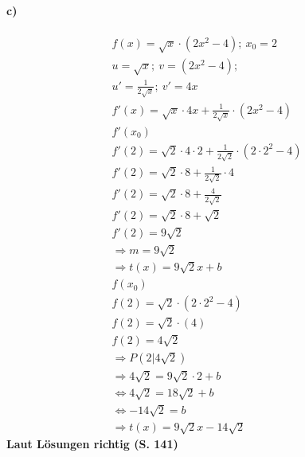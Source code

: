 \documentclass[12pt,a4paper]{report}
\newcommand{\richtig}[1]{\color{ForestGreen}\textbf{
	Laut Lösungen richtig (S. #1)
}\color{black}}
\begin{document}
	\paragraph{c)}
	\begin{align*}
		f(x) = \sqrt{x} \cdot (2x^2 - 4);\ x_0 = 2 \\
		u = \sqrt{x};\ v = (2x^2 - 4);\\
		u'=\frac{1}{2\sqrt{x}};\ v' = 4x \\
		f'(x) = \sqrt{x} \cdot 4x + \frac{1}{2\sqrt{x}} \cdot (2x^2 - 4) \\
		f'(x_0)\\
		f'(2) = \sqrt{2} \cdot 4\cdot 2 + \frac{1}{2\sqrt{2}} \cdot (2\cdot 2^2 - 4) \\
		f'(2) = \sqrt{2} \cdot 8 + \frac{1}{2\sqrt{2}} \cdot 4 \\
		f'(2) = \sqrt{2} \cdot 8 + \frac{4}{2\sqrt{2}} \\
		f'(2) = \sqrt{2} \cdot 8 +\sqrt{2} \\
		f'(2) = 9\sqrt{2} \\
		\Rightarrow m = 9\sqrt{2} \\
		\Rightarrow t(x) = 9\sqrt{2}x + b \\
		f(x_0) \\
		f(2) = \sqrt{2} \cdot (2\cdot 2^2 - 4) \\
		f(2) = \sqrt{2} \cdot (4) \\
		f(2) = 4\sqrt{2} \\
		\Rightarrow P(2|4\sqrt{2}) \\
		\Rightarrow 4\sqrt{2} = 9\sqrt{2}\cdot 2 + b \\
		\Leftrightarrow 4\sqrt{2} = 18\sqrt{2} + b \\
		\Leftrightarrow -14\sqrt{2} = b \\
		\Rightarrow t(x) = 9\sqrt{2}x - 14\sqrt{2}
	\end{align*}
	\richtig{141}
\end{document}
